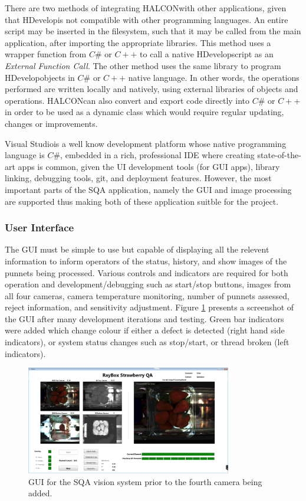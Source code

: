 \documentclass[fleqn,twoside,12pt]{report}
\begin{document}
There are two methods of integrating HALCON\texttrademark with other applications, given that HDevelop\texttrademark is not compatible with other programming languages. An entire script may be inserted in the filesystem, such that it may be called from the main application, after importing the appropriate libraries. This method uses a wrapper function from $C\#$ or $C++$ to call a native HDevelop\texttrademark script as an \textit{External Function Call}. The other method uses the same library to program HDevelop\texttrademark objects in $C\#$ or $C++$ native language. In other words, the operations performed are written locally and natively, using external libraries of objects and operations. HALCON\texttrademark can also convert and export code directly into $C\#$ or $C++$ in order to be used as a dynamic class which would require regular updating, changes or improvements.

Visual Studio\textregistered is a well know development platform whose native programming language is $C\#$, embedded in a rich, professional IDE where creating state-of-the-art apps is common, given the UI development tools (for GUI apps), library linking, debugging tools, git, and deployment features. However, the most important parts of the SQA application, namely the GUI and image processing are supported thus making both of these application suitble for the project.


\subsubsection{User Interface}

The GUI must be simple to use but capable of displaying all the relevent information to inform operators of the status, history, and show images of the punnets being processed. Various controls and indicators are required for both operation and development/debugging such as start/stop buttons, images from all four cameras, camera temperature monitoring, number of punnets assessed, reject information, and sensitivity adjustment. Figure \ref{fig:GUI} presents a screenshot of the GUI after many development iterations and testing. Green bar indicators were added which change colour if either a defect is detected (right hand side indicators), or system status changes such as stop/start, or thread broken (left indicators).  


\begin{figure}[h]
	\centering
	\includegraphics[width=0.8\textwidth]{GUI.png}
	\caption{GUI for the SQA vision system prior to the fourth camera being added.}
	\label{fig:GUI}
\end{figure}
  
\end{document}
